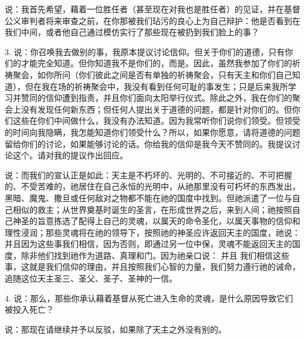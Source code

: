 说：我首先希望，藉着一位胜任者（甚至现在对我也是胜任者）的见证，并在基督公义审判者将来审查之前，在你那被我们玷污的良心上为自己辩护：他是否看到在我们中间，或者他自己通过模仿实行了那些现在被扔到我们脸上的事？\par

3. 说：你召唤我去做别的事，我原本提议讨论信仰。但关于你们的道德，只有你们的才能完全知道。但你知道我不是你们的，而是。因此，虽然我参加了你们的祈祷聚会，如你所问（你们彼此之间是否有单独的祈祷聚会，只有天主和你们自己知道），但在我在场的祈祷聚会中，我没有看到任何可耻的事发生；只是后来我所学习并赞同的信仰遭到指责，并且你们面向太阳举行仪式。除此之外，我在你们的聚会上没有发现任何新东西；但任何人提出关于道德的问题，都是针对你们的。但你们这些在你们中间做什么，我没有办法知道。因为我常听你们说你们领受。但领受的时间向我隐瞒，我怎能知道你们领受什么？所以，如果你愿意，请将道德的问题留给你们的讨论，如果能够讨论的话。你给我的信仰是我今天不赞同的。我提议讨论这个。请对我的提议作出回应。\par

说：而我们的宣认正是如此：天主是不朽坏的、光明的、不可接近的、不可把握的、不受苦难的，祂居住在自己永恒的光明中，从祂那里没有可朽坏的东西发出，黑暗、魔鬼、撒旦或任何敌对之物都不能在祂的国度中找到。但祂派遣了一位与自己相似的救主；从世界奠基时诞生的圣言，在形成世界之后，来到人间；祂按照自己神圣的旨意拣选了配得上自己的灵魂，以属天的命令圣化，以属天事物的信仰和理性浸润；那些灵魂将在祂的领导下，按照祂的神圣应许返回天主的国度，祂说：并且因为这些事我们相信，因为否则，即通过另一位中保，灵魂不能返回天主的国度，除非他们找到祂作为道路、真理和门。因为祂亲口说： 并且 我们相信这些事，这就是我们信仰的理由，并且按照我们心智的力量，我们努力遵行祂的诫命，追随这位天主圣三、圣父、圣子、圣神的一信。\par

4. 说：那么，那些你承认藉着基督从死亡进入生命的灵魂，是什么原因导致它们被投入死亡？\par

说：那现在请继续并予以反驳，如果除了天主之外没有别的。\par

